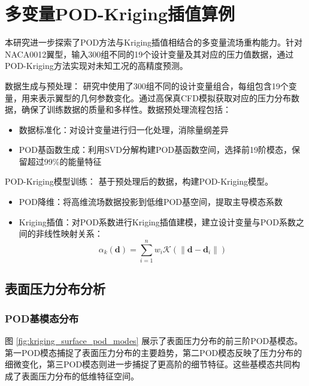 \section{多变量POD-Kriging插值算例}
\label{sec:multi_variable_pod_kriging}

本研究进一步探索了POD方法与Kriging插值相结合的多变量流场重构能力。针对NACA0012翼型，输入300组不同的19个设计变量及其对应的压力值数据，通过POD-Kriging方法实现对未知工况的高精度预测。

数据生成与预处理：
研究中使用了300组不同的设计变量组合，每组包含19个变量，用来表示翼型的几何参数变化。通过高保真CFD模拟获取对应的压力分布数据，确保了训练数据的质量和多样性。数据预处理流程包括：
\begin{itemize}
    \item {数据标准化}：对设计变量进行归一化处理，消除量纲差异
    \item {POD基函数生成}：利用SVD分解构建POD基函数空间，选择前19阶模态，保留超过99\%的能量特征
\end{itemize}

POD-Kriging模型训练：
基于预处理后的数据，构建POD-Kriging模型。
\begin{itemize}
    \item {POD降维}：将高维流场数据投影到低维POD基空间，提取主导模态系数
    \item {Kriging插值}：对POD系数进行Kriging插值建模，建立设计变量与POD系数之间的非线性映射关系：
    \begin{equation}
        \alpha_k(\boldsymbol{d}) = \sum_{i=1}^n w_i \mathcal{K}(\|\boldsymbol{d} - \boldsymbol{d}_i\|)
        \label{eq:kriging_model}
    \end{equation}
\end{itemize}

\subsection{表面压力分布分析}

\subsubsection{POD基模态分布}

图 \ref{fig:kriging_surface_pod_modes} 展示了表面压力分布的前三阶POD基模态。第一POD模态捕捉了表面压力分布的主要趋势，第二POD模态反映了压力分布的细微变化，第三POD模态则进一步捕捉了更高阶的细节特征。这些基模态共同构成了表面压力分布的低维特征空间。

